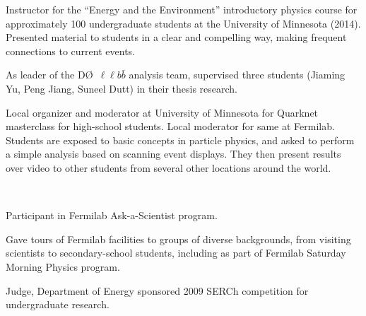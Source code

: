 \documentclass[amsmath,amssymb]{revtex4}
\def\dzero{D\O}
\begin{document}
\begin{list}{}
            {\setlength{\itemsep}{0.0in}\setlength{\parsep}{0.0in}
             \addtolength{\parskip}{-0.5in}}
\item Instructor for the ``Energy and the Environment'' introductory
  physics course for approximately 100 undergraduate students at the
  University of Minnesota (2014).  Presented material to students in a
  clear and compelling way, making frequent connections to current
  events.
\item As leader of the \dzero~$\ell\ell b{\bar b}$ analysis team,
  supervised three students (Jiaming Yu, Peng Jiang, Suneel Dutt) in
  their thesis research.
\item Local organizer and moderator at University of Minnesota for
  Quarknet masterclass for high-school students.  Local moderator for
  same at Fermilab.  Students are exposed to basic concepts in
  particle physics, and asked to perform a simple analysis based on
  scanning event displays.  They then present results over video to
  other students from several other locations around the world.
%
%
\end{list}

\\
\begin{list}{}
            {\setlength{\itemsep}{0.0in}\setlength{\parsep}{0.0in}
             \addtolength{\parskip}{-0.5in}}
\item Participant in Fermilab Ask-a-Scientist program.
\item Gave tours of Fermilab facilities to groups of diverse backgrounds, from visiting scientists
to secondary-school students, including as part of Fermilab Saturday Morning Physics program.
\item Judge, Department of Energy sponsored 2009 SERCh competition for undergraduate research.
\end{list}
\end{document}
